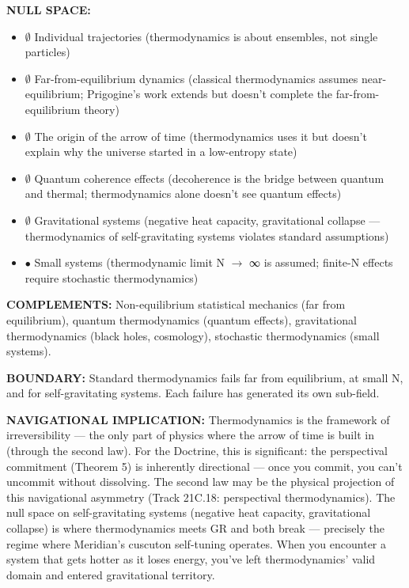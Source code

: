 \textbf{NULL SPACE:}

\begin{itemize}[nosep,leftmargin=*]
  \item $\emptyset$ Individual trajectories (thermodynamics is about ensembles, not single particles)
  \item $\emptyset$ Far-from-equilibrium dynamics (classical thermodynamics assumes near-equilibrium; Prigogine's work extends but doesn't complete the far-from-equilibrium theory)
  \item $\emptyset$ The origin of the arrow of time (thermodynamics uses it but doesn't explain why the universe started in a low-entropy state)
  \item $\emptyset$ Quantum coherence effects (decoherence is the bridge between quantum and thermal; thermodynamics alone doesn't see quantum effects)
  \item $\emptyset$ Gravitational systems (negative heat capacity, gravitational collapse — thermodynamics of self-gravitating systems violates standard assumptions)
  \item $\bullet$ Small systems (thermodynamic limit N $\rightarrow$ ∞ is assumed; finite-N effects require stochastic thermodynamics)
\end{itemize}


\textbf{COMPLEMENTS:} Non-equilibrium statistical mechanics (far from equilibrium), quantum thermodynamics (quantum effects), gravitational thermodynamics (black holes, cosmology), stochastic thermodynamics (small systems).


\textbf{BOUNDARY:} Standard thermodynamics fails far from equilibrium, at small N, and for self-gravitating systems. Each failure has generated its own sub-field.


\textbf{NAVIGATIONAL IMPLICATION:} Thermodynamics is the framework of irreversibility — the only part of physics where the arrow of time is built in (through the second law). For the Doctrine, this is significant: the perspectival commitment (Theorem 5) is inherently directional — once you commit, you can't uncommit without dissolving. The second law may be the physical projection of this navigational asymmetry (Track 21C.18: perspectival thermodynamics). The null space on self-gravitating systems (negative heat capacity, gravitational collapse) is where thermodynamics meets GR and both break — precisely the regime where Meridian's cuscuton self-tuning operates. When you encounter a system that gets hotter as it loses energy, you've left thermodynamics' valid domain and entered gravitational territory.


